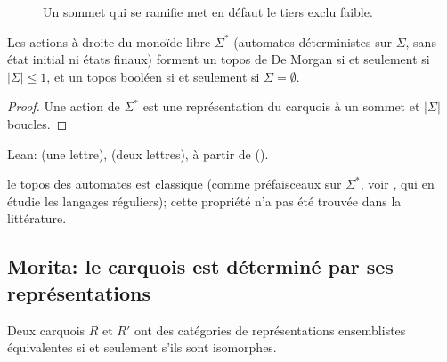 \begin{figure}[ht]
\centering
{}
\caption{Un sommet qui se ramifie met en défaut le tiers exclu faible.}\label{fig:branch}
\end{figure}

\begin{corollary}\label{co:automata}
Les actions à droite du monoïde libre $\Sigma^*$ (automates déterministes sur $\Sigma$, sans état initial ni états finaux) forment un topos de De Morgan si et seulement si $|\Sigma|\le 1$, et un topos booléen si et seulement si $\Sigma = \emptyset$.
\end{corollary}

\begin{proof}
Une action de $\Sigma^*$ est une représentation du carquois à un sommet et $|\Sigma|$ boucles.
\end{proof}

\begin{trace}
\item[vérifier] Lean:  (une lettre),  (deux lettres), à partir de  ().
\item[nouveauté] le topos des automates est classique (comme préfaisceaux sur $\Sigma^*$, voir \cite[prop.~2.2]{hora-automata}, qui en étudie les langages réguliers); cette propriété n'a pas été trouvée dans la littérature.
\end{trace}

\subsection{Morita: le carquois est déterminé par ses représentations}

\begin{theorem}\label{th:quivermorita}
Deux carquois $R$ et $R'$ ont des catégories de représentations ensemblistes équivalentes si et seulement s'ils sont isomorphes.
\end{theorem}


